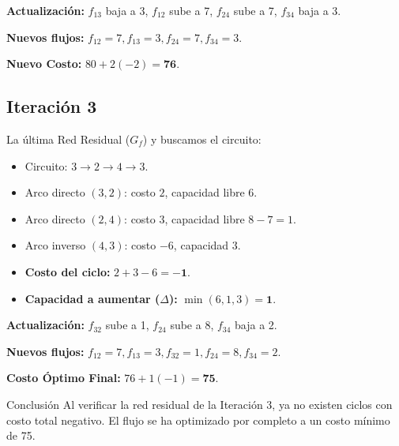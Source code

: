 \documentclass[10pt,a4paper]{article}
\begin{document}
\vspace{1mm}

\textbf{Actualización:} $f_{13}$ baja a 3, $f_{12}$ sube a 7, $f_{24}$ sube a 7, $f_{34}$ baja a 3. \\

\vspace{1mm}

\textbf{Nuevos flujos:} $f_{12}=7, f_{13}=3, f_{24}=7, f_{34}=3$. \\

\vspace{1mm}

\textbf{Nuevo Costo:} $80 + 2(-2) = \mathbf{76}$.

\subsection{Iteración 3}

\vspace{1mm}

La última Red Residual ($G_f$) y buscamos el circuito:

\begin{itemize}
    \item Circuito: $3 \to 2 \to 4 \to 3$.
    \item Arco directo $(3,2)$: costo $2$, capacidad libre $6$.
    \item Arco directo $(2,4)$: costo $3$, capacidad libre $8-7 = 1$.
    \item Arco inverso $(4,3)$: costo $-6$, capacidad $3$.
    \item \textbf{Costo del ciclo:} $2 + 3 - 6 = \mathbf{-1}$.
    \item \textbf{Capacidad a aumentar ($\Delta$):} $\min(6, 1, 3) = \mathbf{1}$.
\end{itemize}

\vspace{1mm}

\textbf{Actualización:} $f_{32}$ sube a 1, $f_{24}$ sube a 8, $f_{34}$ baja a 2.

\vspace{1mm}

\textbf{Nuevos flujos:} $f_{12}=7, f_{13}=3, f_{32}=1, f_{24}=8, f_{34}=2$. 

\vspace{1mm}

\textbf{Costo Óptimo Final:} $76 + 1(-1) = \mathbf{75}$.

\begin{nota}{Conclusión}
Al verificar la red residual de la Iteración 3, ya no existen ciclos con costo total negativo. El flujo se ha optimizado por completo a un costo mínimo de 75.
\end{nota}
\end{document}
